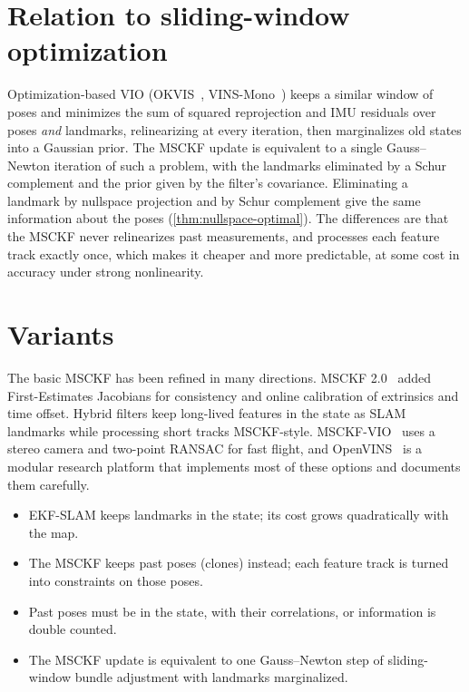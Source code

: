 \section{Relation to sliding-window optimization}

Optimization-based VIO (OKVIS~\cite{leutenegger2015okvis}, VINS-Mono~\cite{qin2018vins}) keeps a similar window of poses and
minimizes the sum of squared reprojection and IMU residuals over poses \emph{and} landmarks, relinearizing at every
iteration, then marginalizes old states into a Gaussian prior. The MSCKF update is equivalent to a single Gauss--Newton
iteration of such a problem, with the landmarks eliminated by a Schur complement and the prior given by the filter's
covariance. Eliminating a landmark by nullspace projection and by Schur complement give the same information about the
poses (\cref{thm:nullspace-optimal}). The differences are that the MSCKF never relinearizes past measurements, and
processes each feature track exactly once, which makes it cheaper and more predictable, at some cost in accuracy under
strong nonlinearity.

\section{Variants}

The basic MSCKF has been refined in many directions. MSCKF 2.0~\cite{li2013msckf2} added First-Estimates Jacobians for
consistency and online calibration of extrinsics and time offset. Hybrid filters keep long-lived features in the state as
SLAM landmarks while processing short tracks MSCKF-style. MSCKF-VIO~\cite{sun2018msckfvio} uses a stereo camera and
two-point RANSAC for fast flight, and OpenVINS~\cite{geneva2020openvins} is a modular research platform that implements most of
these options and documents them carefully.

\begin{takeaways}
\begin{itemize}
  \item EKF-SLAM keeps landmarks in the state; its cost grows quadratically with the map.
  \item The MSCKF keeps past poses (clones) instead; each feature track is turned into constraints on those poses.
  \item Past poses must be in the state, with their correlations, or information is double counted.
  \item The MSCKF update is equivalent to one Gauss--Newton step of sliding-window bundle adjustment with landmarks
        marginalized.
\end{itemize}
\end{takeaways}

